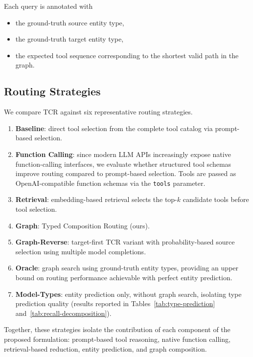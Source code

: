 Each query is annotated with

\begin{itemize}
    \item the ground-truth source entity type,
    \item the ground-truth target entity type,
    \item the expected tool sequence corresponding to the shortest valid path in the graph.
\end{itemize}

\subsection{Routing Strategies}
\label{sec:strategies}

We compare TCR against six representative routing strategies.

\begin{enumerate}
    \item \textbf{Baseline}: direct tool selection from the complete tool catalog via prompt-based selection.
    \item \textbf{Function Calling}: since modern LLM APIs increasingly expose native function-calling interfaces, we evaluate whether structured tool schemas improve routing compared to prompt-based selection. Tools are passed as OpenAI-compatible function schemas via the \texttt{tools} parameter.
    \item \textbf{Retrieval}: embedding-based retrieval selects the top-$k$ candidate tools before tool selection.
    \item \textbf{Graph}: Typed Composition Routing (ours).
    \item \textbf{Graph-Reverse}: target-first TCR variant with probability-based source selection using multiple model completions.
    \item \textbf{Oracle}: graph search using ground-truth entity types, providing an upper bound on routing performance achievable with perfect entity prediction.
    \item \textbf{Model-Types}: entity prediction only, without graph search, isolating type prediction quality (results reported in Tables~\ref{tab:type-prediction} and~\ref{tab:recall-decomposition}).
\end{enumerate}

Together, these strategies isolate the contribution of each component of the proposed formulation: prompt-based tool reasoning, native function calling, retrieval-based reduction, entity prediction, and graph composition.

